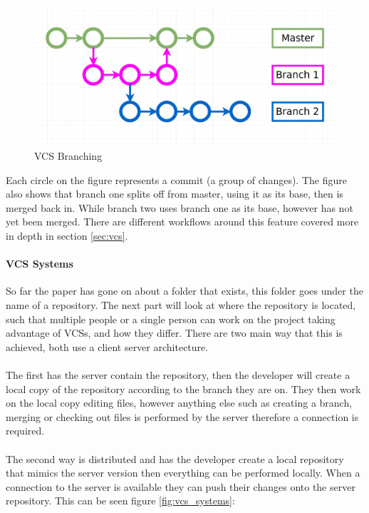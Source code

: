 \begin{figure}[H]
	\centering
	\includegraphics[scale=0.30]{images/branching.jpg}
	\caption{VCS Branching}
	\label{fig:vcs_branching}
\end{figure}

Each circle on the figure represents a commit (a group of changes). The figure also shows that branch one splits off from master, using it as its base, then is merged back in. While branch two uses branch one as its base, however has not yet been merged. There are different workflows around this feature covered more in depth in section \ref{sec:vcs}.

\paragraph{VCS Systems}
So far the paper has gone on about a folder that exists, this folder goes under the name of a repository. The next part will look at where the repository is located, such that multiple people or a single person can work on the project taking advantage of VCSs, and how they differ. There are two main way that this is achieved, both use a client server architecture. 
\\\\
The first has the server contain the repository, then the developer will create a local copy of the repository according to the branch they are on. They then work on the local copy editing files, however anything else such as creating a branch, merging or checking out files is performed by the server therefore a connection is required.
\\\\
The second way is distributed and has the developer create a local repository that mimics the server version then everything can be performed locally. When a connection to the server is available they can push their changes onto the server repository. This can be seen figure \ref{fig:vcs_systems}:

